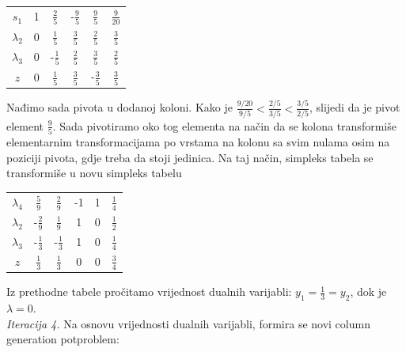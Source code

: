 \documentclass[a4paper, utf8, 11pt, colorlinks]{book}
\begin{document}
\begin{center}
	
	\begin{tabular}{c|cccc|c}
		$s_1$	    &   1      &    $\frac{2}{5}$          &   -$\frac{9}{5}$       &  $\frac{9}{5} $        &  $\frac{9}{20}$ \\
		$\lambda_2$  &   0      &    $\frac{1}{5}$         &   $\frac{3}{5}$        &   $\frac{2}{5}$        &  $\frac{3}{5}$             \\
		$\lambda_3$  &   0      &    -$\frac{1}{5}$        &   $\frac{2}{5}$        &   $\frac{3}{5}$         &  $\frac{2}{5}$            \\ \hline
		$z$          &   0      &    $\frac{1}{5}$         &  $ \frac{3}{5}$        &   -$\frac{3}{5}$         & $\frac{3}{5}$
	\end{tabular}
	
\end{center} 
Nađimo sada pivota u dodanoj koloni. Kako je $\frac{9/20}{9/5} < \frac{2/5}{3/5}< \frac{3/5}{2/5}$, slijedi da je pivot element $\frac{9}{5}$.  Sada pivotiramo oko tog elementa na način da se kolona transformiše elementarnim transformacijama po vrstama na kolonu sa svim nulama osim na poziciji pivota, gdje treba da stoji jedinica. Na taj način, simpleks tabela se transformiše u novu simpleks tabelu 
\begin{center}
	
	\begin{tabular}{c|cccc|c}
		$\lambda_4$	 &   $\frac{5}{9}$      &    $\frac{2}{9}$          &   -1       &  1      &  $\frac{1}{4}$ \\
		$\lambda_2$  &   -$\frac{2}{9}$    &   $\frac{1}{9}$        &   1        &   0         &  $\frac{1}{2}$        \\
	    $\lambda_3$  &  -$\frac{1}{3}$     &    -$\frac{1}{3}$      &   1        &   0        &  $\frac{1}{4}$      
		    \\ \hline
		$z$          &   $\frac{1}{3}$     &    $\frac{1}{3}$         &  $0$        &  0         & $\frac{3}{4}$
	\end{tabular}
	
\end{center} 
Iz prethodne tabele pročitamo vrijednost dualnih varijabli: $y_1 =  \frac{1}{3}=y_2$, dok je $\lambda=0$. \\
\emph{Iteracija 4.} Na osnovu vrijednosti dualnih varijabli, formira se novi column generation potproblem:
 
\end{document}
